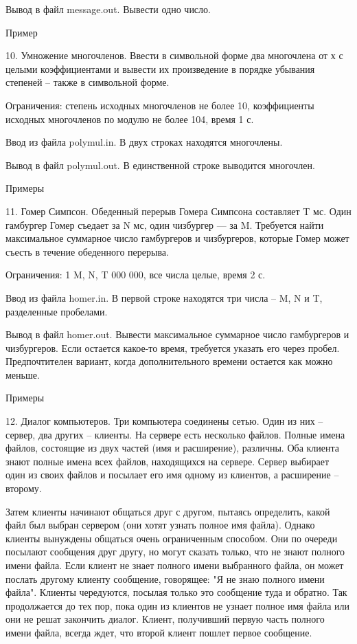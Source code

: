 \documentclass[]{article}
\begin{document}
Вывод в файл message.out. Вывести одно число.

Пример



10. Умножение многочленов. Ввести в символьной форме два многочлена от х с целыми коэффициентами и вывести их произведение в порядке убывания степеней – также в символьной форме.

Ограничения: степень исходных многочленов не более 10, коэффициенты исходных многочленов по модулю не более 104, время 1 с.

Ввод из файла polymul.in. В двух строках находятся многочлены.

Вывод в файл polymul.out. В единственной строке выводится многочлен.

Примеры



11. Гомер Симпсон. Обеденный перерыв Гомера Симпсона составляет T мс. Один гамбургер Гомер съедает за N мс, один чизбургер — за M. Требуется найти максимальное суммарное число гамбургеров и чизбургеров, которые Гомер может съесть в течение обеденного перерыва.

Ограничения: 1 \leq M, N, T  000 000, все числа целые, время 2 с.

Ввод из файла homer.in. В первой строке находятся три числа – M, N и T, разделенные пробелами.

Вывод в файл homer.out. Вывести максимальное суммарное число гамбургеров и чизбургеров. Если остается какое-то время, требуется указать его через пробел. Предпочтителен вариант, когда дополнительного времени остается как можно меньше.

Примеры



12. Диалог компьютеров. Три компьютера соединены сетью. Один из них – сервер, два других – клиенты. На сервере есть несколько файлов. Полные имена файлов, состоящие из двух частей (имя и расширение), различны. Оба клиента знают полные имена всех файлов, находящихся на сервере. Сервер выбирает один из своих файлов и посылает его имя одному из клиентов, а расширение – второму.

Затем клиенты начинают общаться друг с другом, пытаясь определить, какой файл был выбран сервером (они хотят узнать полное имя файла). Однако клиенты вынуждены общаться очень ограниченным способом. Они по очереди посылают сообщения друг другу, но могут сказать только, что не знают полного имени файла. Если клиент не знает полного имени выбранного файла, он может послать другому клиенту сообщение, говорящее: "Я не знаю полного имени файла". Клиенты чередуются, посылая только это сообщение туда и обратно. Так продолжается до тех пор, пока один из клиентов не узнает полное имя файла или они не решат закончить диалог. Клиент, получивший первую часть полного имени файла, всегда ждет, что второй клиент пошлет первое сообщение.
\end{document}
